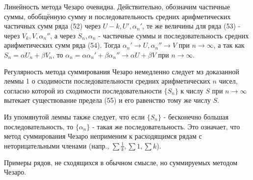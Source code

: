 Линейность метода Чезаро очевидна. Действительно, обозначим частичные суммы, обобщённую сумму и последовательность средних арифметических частичных сумм ряда (52) через $U-k, U', \alpha_n'$, те же величины для ряда (53) - через $V_k, V, \alpha_n''$, а через $S_n, \alpha_n$ - частичные суммы и последовательность средних арифметических сумм ряда (54). Тогда $\alpha_n' \rightarrow U, \alpha_n'' \rightarrow V$ при $n \rightarrow \infty$, а так как $S_n = \alpha U_n + \beta V_n$, то $\alpha_n = \alpha\alpha_n' + \beta\alpha_n'' \rightarrow \alpha U + \beta V$ при $n \rightarrow \infty$.

Регулярность метода суммирования Чезаро немедленно следует мз доказанной леммы 1 о сходимости последовательности средних арифметических $n$ чисел, согласно которой из сходимости последовательности $\{S_n\}$ к числу $S$ при $n \rightarrow \infty$ вытекает существование предела (55) и его равенство тому же числу $S$.

Из упомянутой леммы также следует, что если $\{S_n\}$ - бесконечно большая последовательность, то $\{\alpha_n\}$ - такая же последовательность. Это означает, что метод суммирования Чезаро неприменим к расходящимся рядам с неторицательными членами (напр., $\sum \frac{1}{k}, \sum 1, \sum k$).

Примеры рядов, не сходящихся в обычном смысле, но суммируемых методом Чезаро.

